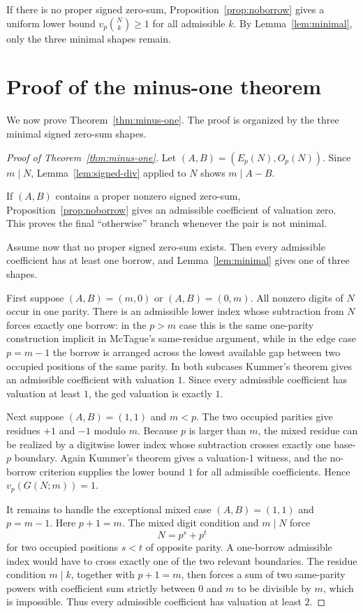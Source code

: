 \documentclass[11pt]{article}
\begin{document}
If there is no proper signed zero-sum, Proposition~\ref{prop:noborrow} gives a
uniform lower bound $v_p\binom Nk\geq 1$ for all admissible $k$.  By
Lemma~\ref{lem:minimal}, only the three minimal shapes remain.

\section{Proof of the minus-one theorem}\label{sec:proof-main}

We now prove Theorem~\ref{thm:minus-one}.  The proof is organized by the three
minimal signed zero-sum shapes.

\begin{proof}[Proof of Theorem~\ref{thm:minus-one}]
Let $(A,B)=(E_p(N),O_p(N))$.  Since $m\mid N$, Lemma~\ref{lem:signed-div}
applied to $N$ shows $m\mid A-B$.

If $(A,B)$ contains a proper nonzero signed zero-sum, Proposition~\ref{prop:noborrow}
gives an admissible coefficient of valuation zero.  This proves the final
``otherwise'' branch whenever the pair is not minimal.

Assume now that no proper signed zero-sum exists.  Then every admissible
coefficient has at least one borrow, and Lemma~\ref{lem:minimal} gives one of
three shapes.

First suppose $(A,B)=(m,0)$ or $(A,B)=(0,m)$.  All nonzero digits of $N$ occur
in one parity.  There is an admissible lower index whose subtraction from $N$
forces exactly one borrow: in the $p>m$ case this is the same one-parity
construction implicit in McTague's same-residue argument, while in the edge case
$p=m-1$ the borrow is arranged across the lowest available gap between two
occupied positions of the same parity.  In both subcases Kummer's theorem gives
an admissible coefficient with valuation $1$.  Since every admissible coefficient
has valuation at least $1$, the gcd valuation is exactly $1$.

Next suppose $(A,B)=(1,1)$ and $m<p$.  The two occupied parities give residues
$+1$ and $-1$ modulo $m$.  Because $p$ is larger than $m$, the mixed residue can
be realized by a digitwise lower index whose subtraction crosses exactly one
base-$p$ boundary.  Again Kummer's theorem gives a valuation-$1$ witness, and
the no-borrow criterion supplies the lower bound $1$ for all admissible
coefficients.  Hence $v_p(G(N;m))=1$.

It remains to handle the exceptional mixed case $(A,B)=(1,1)$ and $p=m-1$.
Here $p+1=m$.  The mixed digit condition and $m\mid N$ force
\[
  N=p^s+p^t
\]
for two occupied positions $s<t$ of opposite parity.  A one-borrow admissible
index would have to cross exactly one of the two relevant boundaries.  The
residue condition $m\mid k$, together with $p+1=m$, then forces a sum of two
same-parity powers with coefficient sum strictly between $0$ and $m$ to be
divisible by $m$, which is impossible.  Thus every admissible coefficient has
valuation at least $2$.


\end{proof}
\end{document}
